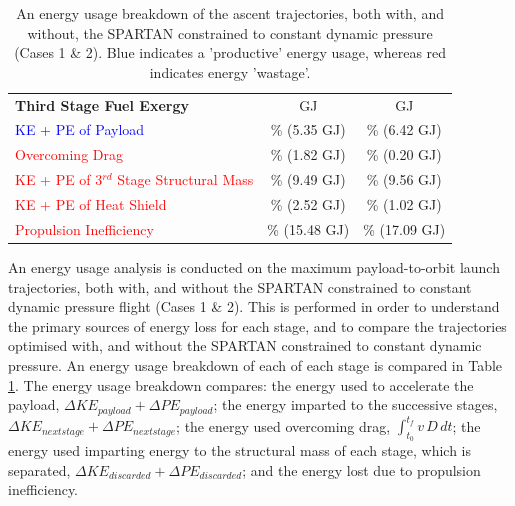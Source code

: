 \begin{table}[ht]
\begin{tabular}{l c c}
		\textbf{Third Stage Fuel Exergy}  
		& \textbf{\thirdEnergyConstqNoReturn}  GJ & \textbf{\thirdEnergyStandardNoReturn}  GJ
		\\
		\textcolor{blue}{KE + PE of Payload}  
		&\thirddExergyEffConstqNoReturn \% (5.35 GJ) &\thirddExergyEffStandardNoReturn \% (6.42 GJ)
		\\
		\textcolor{red}{Overcoming Drag}  
		& \WDthreeConstqNoReturn \% (1.82 GJ) & \WDthreeStandardNoReturn \% (0.20 GJ)
		\\
		\textcolor{red}{KE + PE  of 3$^{rd}$ Stage Structural Mass}  
		& \WthreeConstqNoReturn \% (9.49 GJ) & \WthreeStandardNoReturn \% (9.56 GJ)
		\\
		
		\textcolor{red}{KE + PE of Heat Shield}  
		
		& \WHSthreeConstqNoReturn \% (2.52 GJ) & \WHSthreeStandardNoReturn \% (1.02 GJ)
		\\
		
		\textcolor{red}{Propulsion Inefficiency}  
		& \PlossthreeCombinedConstqNoReturn \% (15.48 GJ) & \PlossthreeCombinedStandardNoReturn \% (17.09 GJ)
		\\
		\hline 
	\end{tabular} 
	\caption{An energy usage breakdown of the ascent trajectories, both with, and without, the SPARTAN constrained to constant dynamic pressure (Cases 1 \& 2). Blue indicates a 'productive' energy usage, whereas red indicates energy 'wastage'.}
	\label{tab:effStandardNoReturn}
\end{table}



An energy usage analysis is conducted on the maximum payload-to-orbit launch trajectories, both with, and without the SPARTAN constrained to constant dynamic pressure flight (Cases 1 \& 2). This is performed in order to understand the primary sources of energy loss for each stage, and to compare the trajectories optimised with, and without the SPARTAN constrained to constant dynamic pressure. An energy usage breakdown of each of each stage is compared in Table \ref{tab:effStandardNoReturn}. The energy usage breakdown compares: the energy used to accelerate the payload, $\Delta KE_{payload} + \Delta PE_{payload}$; the energy imparted to the successive stages, $\Delta KE_{next stage} + \Delta PE_{next stage}$; the energy used overcoming drag, $\int_{t_0}^{t_f} v\,D \, dt$; the energy used imparting energy to the structural mass of each stage, which is separated, $\Delta KE_{discarded} + \Delta PE_{discarded}$; and the energy lost due to propulsion inefficiency. 



